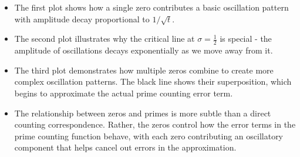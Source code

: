 \documentclass{article}
\begin{document}
\begin{adjustwidth}{-1cm}{-1cm}
    \begin{itemize}
    \item The first plot shows how a single zero contributes a basic oscillation pattern with amplitude decay proportional to $1/\sqrt{t}$.
    
    \item The second plot illustrates why the critical line at $\sigma=\frac{1}{2}$ is special - the amplitude of oscillations decays exponentially as we move away from it.
    
    \item The third plot demonstrates how multiple zeros combine to create more complex oscillation patterns. The black line shows their superposition, which begins to approximate the actual prime counting error term.
    
    \item The relationship between zeros and primes is more subtle than a direct counting correspondence. Rather, the zeros control how the error terms in the prime counting function behave, with each zero contributing an oscillatory component that helps cancel out errors in the approximation.
    \end{itemize}
\end{adjustwidth}
\end{document}
